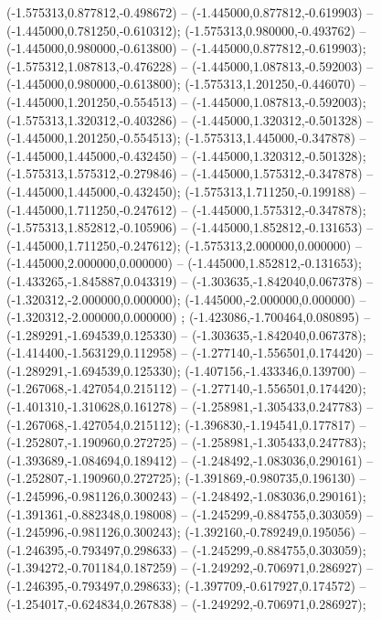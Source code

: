  (-1.575313,0.877812,-0.498672) -- (-1.445000,0.877812,-0.619903) -- (-1.445000,0.781250,-0.610312);
 (-1.575313,0.980000,-0.493762) -- (-1.445000,0.980000,-0.613800) -- (-1.445000,0.877812,-0.619903);
 (-1.575312,1.087813,-0.476228) -- (-1.445000,1.087813,-0.592003) -- (-1.445000,0.980000,-0.613800);
 (-1.575313,1.201250,-0.446070) -- (-1.445000,1.201250,-0.554513) -- (-1.445000,1.087813,-0.592003);
 (-1.575313,1.320312,-0.403286) -- (-1.445000,1.320312,-0.501328) -- (-1.445000,1.201250,-0.554513);
 (-1.575313,1.445000,-0.347878) -- (-1.445000,1.445000,-0.432450) -- (-1.445000,1.320312,-0.501328);
 (-1.575313,1.575312,-0.279846) -- (-1.445000,1.575312,-0.347878) -- (-1.445000,1.445000,-0.432450);
 (-1.575313,1.711250,-0.199188) -- (-1.445000,1.711250,-0.247612) -- (-1.445000,1.575312,-0.347878);
 (-1.575313,1.852812,-0.105906) -- (-1.445000,1.852812,-0.131653) -- (-1.445000,1.711250,-0.247612);
 (-1.575313,2.000000,0.000000) -- (-1.445000,2.000000,0.000000) -- (-1.445000,1.852812,-0.131653);
 (-1.433265,-1.845887,0.043319) -- (-1.303635,-1.842040,0.067378) -- (-1.320312,-2.000000,0.000000);
 (-1.445000,-2.000000,0.000000) -- (-1.320312,-2.000000,0.000000) ;
 (-1.423086,-1.700464,0.080895) -- (-1.289291,-1.694539,0.125330) -- (-1.303635,-1.842040,0.067378);
 (-1.414400,-1.563129,0.112958) -- (-1.277140,-1.556501,0.174420) -- (-1.289291,-1.694539,0.125330);
 (-1.407156,-1.433346,0.139700) -- (-1.267068,-1.427054,0.215112) -- (-1.277140,-1.556501,0.174420);
 (-1.401310,-1.310628,0.161278) -- (-1.258981,-1.305433,0.247783) -- (-1.267068,-1.427054,0.215112);
 (-1.396830,-1.194541,0.177817) -- (-1.252807,-1.190960,0.272725) -- (-1.258981,-1.305433,0.247783);
 (-1.393689,-1.084694,0.189412) -- (-1.248492,-1.083036,0.290161) -- (-1.252807,-1.190960,0.272725);
 (-1.391869,-0.980735,0.196130) -- (-1.245996,-0.981126,0.300243) -- (-1.248492,-1.083036,0.290161);
 (-1.391361,-0.882348,0.198008) -- (-1.245299,-0.884755,0.303059) -- (-1.245996,-0.981126,0.300243);
 (-1.392160,-0.789249,0.195056) -- (-1.246395,-0.793497,0.298633) -- (-1.245299,-0.884755,0.303059);
 (-1.394272,-0.701184,0.187259) -- (-1.249292,-0.706971,0.286927) -- (-1.246395,-0.793497,0.298633);
 (-1.397709,-0.617927,0.174572) -- (-1.254017,-0.624834,0.267838) -- (-1.249292,-0.706971,0.286927);
